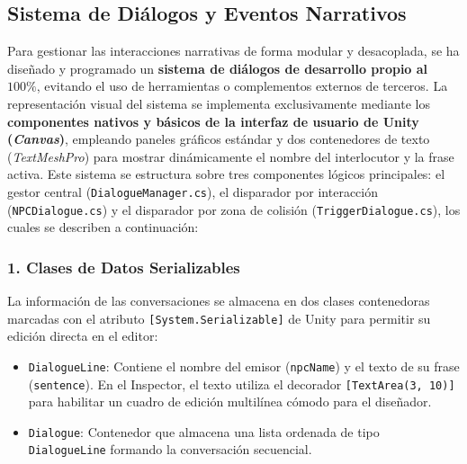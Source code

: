 \subsection{Sistema de Diálogos y Eventos Narrativos}
Para gestionar las interacciones narrativas de forma modular y desacoplada, se ha diseñado y programado un \textbf{sistema de diálogos de desarrollo propio al $100\%$}, evitando el uso de herramientas o complementos externos de terceros. La representación visual del sistema se implementa exclusivamente mediante los \textbf{componentes nativos y básicos de la interfaz de usuario de Unity (\textit{Canvas})}, empleando paneles gráficos estándar y dos contenedores de texto (\textit{TextMeshPro}) para mostrar dinámicamente el nombre del interlocutor y la frase activa. Este sistema se estructura sobre tres componentes lógicos principales: el gestor central (\texttt{DialogueManager.cs}), el disparador por interacción (\texttt{NPCDialogue.cs}) y el disparador por zona de colisión (\texttt{TriggerDialogue.cs}), los cuales se describen a continuación:

\subsubsection{1. Clases de Datos Serializables}
La información de las conversaciones se almacena en dos clases contenedoras marcadas con el atributo \texttt{[System.Serializable]} de Unity para permitir su edición directa en el editor:
\begin{itemize}
    \item \texttt{DialogueLine}: Contiene el nombre del emisor (\texttt{npcName}) y el texto de su frase (\texttt{sentence}). En el Inspector, el texto utiliza el decorador \texttt{[TextArea(3, 10)]} para habilitar un cuadro de edición multilínea cómodo para el diseñador.
    \item \texttt{Dialogue}: Contenedor que almacena una lista ordenada de tipo \texttt{DialogueLine} formando la conversación secuencial.
\end{itemize}

